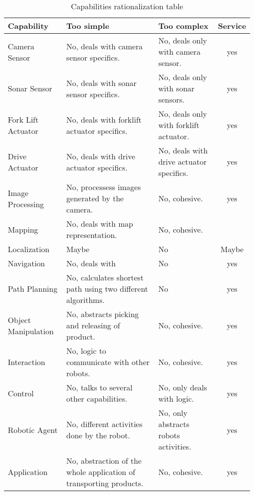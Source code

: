 \begin{table}[ht]
	\centering
	\begin{tabular}{| l | p{3.2cm} | p{3.2cm} | c |}
		\hline
		Capability & Too simple & Too complex & Service\\
		\hline
		Camera Sensor 		& No, deals with camera sensor specifics. & No, deals only with camera sensor. & yes\\
		\hline
		Sonar Sensor 		& No, deals with sonar sensor specifics. & No, deals only with sonar sensors. & yes\\
		\hline
		Fork Lift Actuator 	& No, deals with forklift actuator specifics. & No, deals only with forklift actuator. & yes\\
		\hline
		Drive Actuator 		& No, deals with drive actuator specifics. & No, deals with drive actuator specifics. & yes\\
		\hline
		Image Processing 	& No, processess images generated by the camera. & No, cohesive. & yes\\
		\hline
		Mapping 			& No, deals with map representation. & No, cohesive. &\\
		\hline
		Localization 		& Maybe & No & Maybe\\ %
		\hline
		Navigation 			& No, deals with & No & yes\\
		\hline
		Path Planning 		& No, calculates shortest path using two different algorithms. & No & yes\\
		\hline
		Object Manipulation & No, abstracts picking and releasing of product. & No, cohesive. & yes\\
		\hline
		Interaction 		& No, logic to communicate with other robots. & No, cohesive. & yes\\
		\hline
		Control 			& No, talks to several other capabilities. & No, only deals with logic. & yes\\
		\hline
		Robotic Agent 		& No, different activities done by the robot. & No, only abstracts robots activities. & yes\\
		\hline
		Application 		& No, abstraction of the whole application of transporting products. & No, cohesive. & yes\\
		\hline
	\end{tabular}
	\caption{Capabilities rationalization table}
\end{table}
